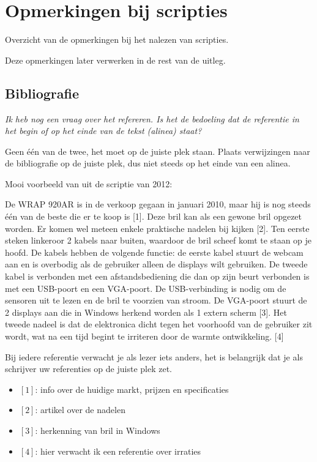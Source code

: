 \chapter{Opmerkingen bij scripties}
\label{chap_app1}
Overzicht van de opmerkingen bij het nalezen van scripties.

Deze opmerkingen later verwerken in de rest van de uitleg.

\section{Bibliografie}

\textit{Ik heb nog een vraag over het refereren. Is het de bedoeling dat de referentie in het begin of op het einde van de tekst (alinea) staat?}

Geen \'e\'en van de twee, het moet op de juiste plek staan.
Plaats verwijzingen naar de bibliografie op de juiste plek, dus niet steeds op het einde van een alinea.

Mooi voorbeeld van uit de scriptie van 2012:

De WRAP 920AR is in de verkoop gegaan in januari 2010, maar hij is nog steeds \'e\'en van de beste 
die er te koop is [1]. 
Deze bril kan als een gewone bril opgezet worden. Er komen wel meteen enkele praktische
nadelen bij kijken [2]. Ten eerste steken linkeroor 2 kabels naar buiten, waardoor de bril scheef
komt te staan op je hoofd. De kabels hebben de volgende functie: de eerste kabel stuurt de
webcam aan en is overbodig als de gebruiker alleen de displays wilt gebruiken. De tweede kabel
is verbonden met een afstandsbediening die dan op zijn beurt verbonden is met een USB-poort
en een VGA-poort. De USB-verbinding is nodig om de sensoren uit te lezen en de bril te
voorzien van stroom. De VGA-poort stuurt de 2 displays aan die in Windows herkend worden
als 1 extern scherm [3]. Het tweede nadeel is dat de elektronica dicht tegen het voorhoofd van de
gebruiker zit wordt, wat na een tijd begint te irriteren door de warmte ontwikkeling. [4]

Bij iedere referentie verwacht je als lezer iets anders, het is belangrijk dat je als schrijver uw referenties op de juiste plek zet.

\begin{itemize}
 \item $[1]$: info over de huidige markt, prijzen en specificaties
 \item $[2]$: artikel over de nadelen
 \item $[3]$: herkenning van bril in Windows
 \item $[4]$: hier verwacht ik een referentie over irraties
\end{itemize}



